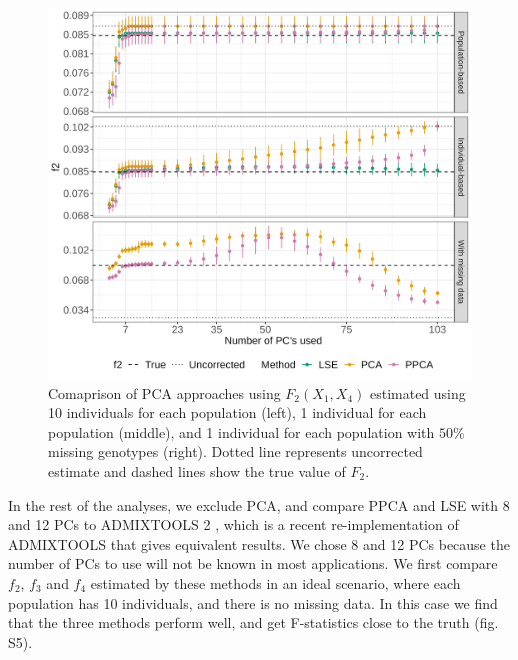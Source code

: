 \documentclass[12pt, letterpaper]{article}
\begin{document}
\begin{figure}[ht!]
    \includegraphics[width=16.5cm]{plots/simfiles_Ne1000_split_times1000/npop10_nind100/missing0.5/mu0.05_main_fig_all_pca.png}
    \centering
    \caption{Comaprison of PCA approaches using $F_2(X_1,X_4)$ estimated using 10 individuals for each population (left), 1 individual for each population (middle), and 1 individual for each population with $50\%$ missing genotypes (right). Dotted line represents uncorrected estimate and dashed lines show the true value of $F_2$.}
    \label{fig:comparison}
\end{figure}


In the rest of the analyses, we exclude PCA, and compare PPCA and LSE with 8 and 12 PCs to ADMIXTOOLS 2 \cite{maier_limits_2022}, which is a recent re-implementation of ADMIXTOOLS \cite{patterson_ancient_2012} that gives equivalent results. We chose 8 and 12 PCs because the number of PCs to use will not be known in most applications. We first compare $f_2$, $f_3$ and $f_4$ estimated by these methods in an ideal scenario, where each population has 10 individuals, and there is no missing data. In this case we find that the three methods perform well, and get F-statistics close to the truth (fig. S5). 
\end{document}
